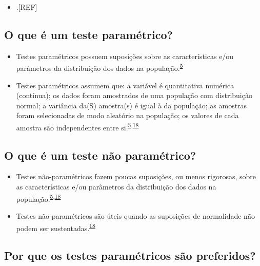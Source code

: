 \documentclass[
]{book}
\providecommand{\tightlist}{%
  \setlength{\itemsep}{0pt}\setlength{\parskip}{0pt}}
\begin{document}
\begin{itemize}
\tightlist
\item
  .{[}REF{]}
\end{itemize}

\hypertarget{o-que-uxe9-um-teste-paramuxe9trico}{%
\subsection{O que é um teste paramétrico?}\label{o-que-uxe9-um-teste-paramuxe9trico}}

\begin{itemize}
\item
  Testes paramétricos possuem suposições sobre as características e/ou parâmetros da distribuição dos dados na população.\textsuperscript{\protect\hyperlink{ref-vetter2017}{5}}
\item
  Testes paramétricos assumem que: a variável é quantitativa numérica (contínua); os dados foram amostrados de uma população com distribuição normal; a variância da(S) amostra(s) é igual à da população; as amostras foram selecionadas de modo aleatório na população; os valores de cada amostra são independentes entre si.\textsuperscript{\protect\hyperlink{ref-vetter2017}{5},\protect\hyperlink{ref-Ali2016}{18}}
\end{itemize}

\hypertarget{o-que-uxe9-um-teste-nuxe3o-paramuxe9trico}{%
\subsection{O que é um teste não paramétrico?}\label{o-que-uxe9-um-teste-nuxe3o-paramuxe9trico}}

\begin{itemize}
\item
  Testes não-paramétricos fazem poucas suposições, ou menos rigorosas, sobre as características e/ou parâmetros da distribuição dos dados na população.\textsuperscript{\protect\hyperlink{ref-vetter2017}{5},\protect\hyperlink{ref-Ali2016}{18}}
\item
  Testes não-paramétricos são úteis quando as suposições de normalidade não podem ser sustentadas.\textsuperscript{\protect\hyperlink{ref-Ali2016}{18}}
\end{itemize}

\hypertarget{por-que-os-testes-paramuxe9tricos-suxe3o-preferidos}{%
\subsection{Por que os testes paramétricos são preferidos?}\label{por-que-os-testes-paramuxe9tricos-suxe3o-preferidos}}
\end{document}
